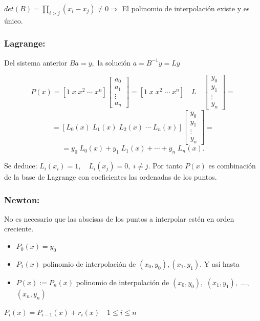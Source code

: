 \documentclass[twoside]{report}
\begin{document}
\vspace{0.3cm}

$det(B)=\prod_ {i>j}(x_i-x_j)\neq 0 \Rightarrow$ El polinomio de interpolación existe y es único.

\subsubsection{Lagrange:}

Del sistema anterior $Ba=y,$ la solución $a=B^{-1}y=Ly$

$$P(x)=[1\;x\;x^2\; \cdots\; x^n]\left[\begin{array}{c} a_0\\a_1\\
\vdots \\a_n \end{array}\right]=[1\;x\;x^2\; \cdots\; x^n]\quad L\quad \left[\begin{array}{c} y_0\\y_1\\
\vdots \\y_n \end{array}\right]=$$
$$=[L_0(x)\;L_1(x)\;L_2(x)\; \cdots\; L_n(x)]\left[\begin{array}{c} y_0\\y_1\\
\vdots \\y_n
\end{array}\right]=$$
$$=y_0\;L_0(x)+y_1\;L_1(x)+\cdots+y_n\;L_n(x).$$

Se deduce: $L_i(x_i)=1,\quad L_i(x_j)=0, \;i\neq j.$ Por tanto $P(x)$ es combinación de la base de Lagrange con coeficientes las ordenadas de los puntos.

\subsubsection{Newton:}

No es necesario que las abscisas de los puntos a interpolar estén en orden creciente.

\begin{itemize}
\item $P_0(x)=y_0$
\item $P_1(x)$ polinomio de interpolación de $(x_0,y_0), (x_1,y_1).$ Y así hasta
\item $P(x):=P_n(x)$ polinomio de interpolación de $(x_0,y_0),$ $(x_1,y_1),$ $\ldots,$ $(x_n,y_n)$
\end{itemize}

\begin{defi}
$P_i(x)=P_{i-1}(x)+r_i(x) \quad 1\leq i\leq n$
\end{defi}
\end{document}
